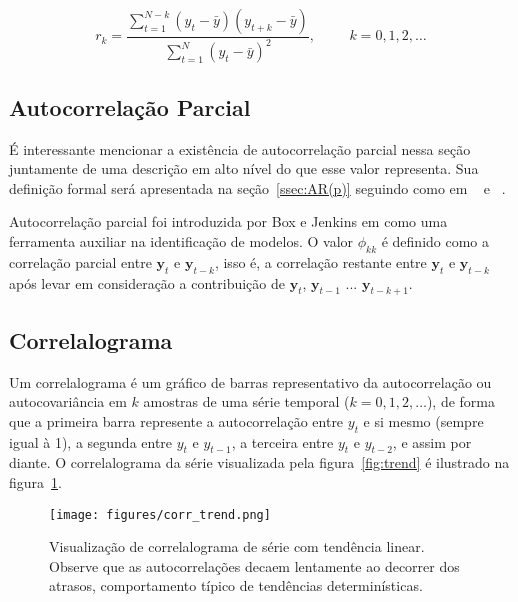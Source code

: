 \vspace{1cm}

\begin{equation}\label{eq:autocorr}
    r_k = \frac{\sum_{t=1}^{N-k}(y_t - \bar{y})(y_{t+k}-\bar{y})}{\sum_{t=1}^{N}(y_t - \bar{y})^2}  , \hspace{1cm} k = 0, 1, 2, \dots
\end{equation}

\vspace{1cm}

\subsection{Autocorrelação Parcial}

É interessante mencionar a existência de autocorrelação parcial nessa seção
juntamente de uma descrição em alto nível do que esse valor representa. Sua
definição formal será apresentada na seção~\ref{ssec:AR(p)} seguindo como em
~\cite{chatfield} e ~\cite{morettin_econometria}.

Autocorrelação parcial foi introduzida por Box e Jenkins em\cite{box} como uma
ferramenta auxiliar na identificação de modelos. O valor $\phi_{kk}$ é
definido como a correlação parcial entre $\mathbf{y}_t$ e $\mathbf{y}_{t - k}$,
isso é, a correlação restante entre $\mathbf{y}_t$ e $\mathbf{y}_{t - k}$ após
levar em consideração a contribuição de $\mathbf{y}_t$, $\mathbf{y}_{t - 1}$
$...$ $\mathbf{y}_{t - k + 1}$.

\subsection{Correlalograma}\label{ssec:correlalogram}

Um correlalograma é um gráfico de barras representativo da autocorrelação ou
autocovariância em $k$ amostras de uma série temporal ($k=0, 1, 2, \dots$), de
forma que a primeira barra represente a autocorrelação entre $y_t$ e si mesmo
(sempre igual à 1), a segunda entre $y_t$ e $y_{t-1}$, a terceira entre $y_t$ e
$y_{t-2}$, e assim por diante. O correlalograma da série visualizada pela
figura~\ref{fig:trend} é ilustrado na figura~\ref{fig:correlalogram}.

\begin{figure}
    \centering
    \texttt{[image: figures/corr\_trend.png]}
    \caption{Visualização de correlalograma de série com tendência linear.
    Observe que as autocorrelações decaem lentamente ao decorrer dos atrasos,
    comportamento típico de tendências determinísticas.}
    \label{fig:correlalogram}
\end{figure}

